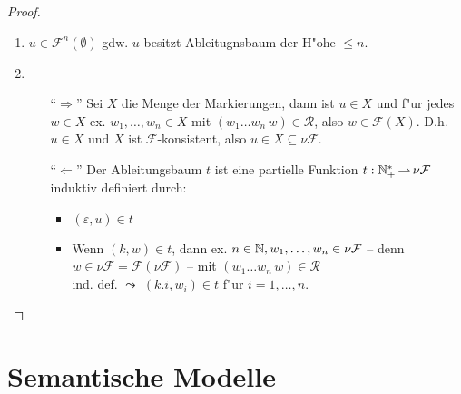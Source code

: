 \documentclass[12pt,a4paper,final]{article}
\begin{document}
\begin{proof} \
  \begin{enumerate}
  \item $u \in \mathcal{F}^n(\emptyset)$ gdw. $u$ besitzt Ableitugnsbaum der H"ohe $\le n$.
  \item 
    \begin{itemize}
    \item[``$\Rightarrow$'']
      Sei $X$ die Menge der Markierungen, dann ist $u \in X$ und f"ur jedes $w \in X$ ex.
      $w_1,\ldots,w_n \in X$ mit $(w_1 \ldots w_n\,w) \in \mathcal{R}$, also
      $w \in \mathcal{F}(X)$. D.h. $u \in X$ und $X$ ist $\mathcal{F}$-konsistent, also
      $u \in X \subseteq \nu \mathcal{F}$.
    \item[``$\Leftarrow$'']
      Der Ableitungsbaum $t$ ist eine partielle Funktion $t: \mathbb N_+^* \operatorname{\rightharpoonup} \nu\mathcal{F}$ induktiv definiert
      durch:
      \begin{itemize}
      \item $(\varepsilon,u) \in t$
      \item Wenn $(k,w) \in t$, dann ex. $n\in\mathbb N,w_1,\ldots,w_n \in \nu\mathcal{F}$ --
        denn $w \in \nu\mathcal{F} = \mathcal{F}(\nu\mathcal{F})$ -- mit
        $(w_1 \ldots w_n\,w) \in \mathcal{R}$ \\
        ind. def. $\leadsto$ $(k.i,w_i) \in t$ f"ur $i=1,\ldots,n$.
      \end{itemize}
    \end{itemize}
  \end{enumerate}
\end{proof}



\section{Semantische Modelle}
\label{sec:Semantische_Modelle}
\end{document}
